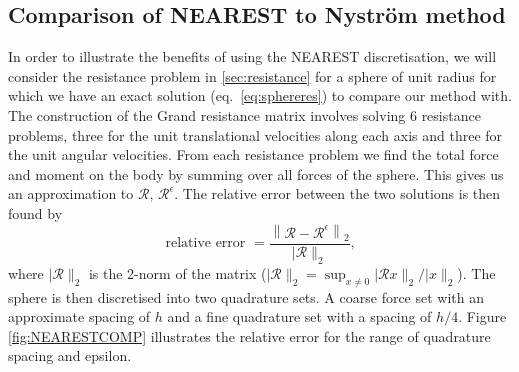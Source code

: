 \subsection{Comparison of NEAREST to Nyström method}
In order to illustrate the benefits of using the NEAREST discretisation, we will consider the resistance problem in \cref{sec:resistance} for a sphere of unit radius for which we have an exact solution (eq.~\ref{eq:sphereres}) to compare our method with. The construction of the Grand resistance matrix involves solving $6$ resistance problems, three for the unit translational velocities along each axis and three for the unit angular velocities. From each resistance problem we find the total force and moment on the body by summing over all forces of the sphere. This gives us an approximation to $\mathcal{R}$, $\mathcal{R}^\epsilon$. The relative error between the two solutions is then found by 
\begin{equation}
    \text { relative error }=\frac{\left\lVert \mathcal{R}-\mathcal{R}^{\epsilon}\right\rVert_{2}}{\lvert\mathcal{R}\rVert_{2}} \text {, }
    \label{eq:RelativeError}
\end{equation}
where ${\lvert\mathcal{R}\rVert_{2}}$ is the 2-norm of the matrix ($\lvert\mathcal{R}\rVert_{2}=\sup_{x \neq 0}\lvert\mathcal{R}x\rVert_{2} /\lvert x\rVert_{2}$).
The sphere is then discretised into two quadrature sets. A coarse force set with an approximate spacing of $h$ and a fine quadrature set with a spacing of $h/4$. Figure \ref{fig:NEARESTCOMP} illustrates the relative error for the range of quadrature spacing and epsilon. 

